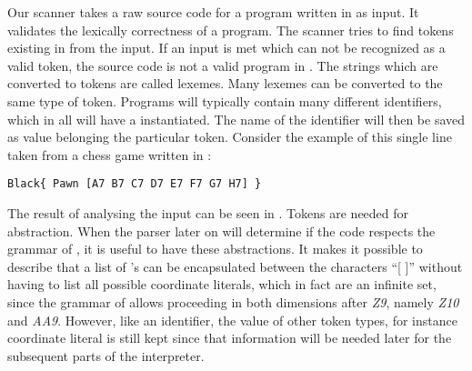 Our scanner takes a raw source code for a program written in \productname{} as input. It validates the lexically correctness of a \productname{} program. The scanner tries to find tokens existing in \productname{} from the input. If an input is met which can not be recognized as a valid token, the source code is not a valid program in \productname{}.
 The strings which are converted to tokens are called lexemes. Many lexemes can be converted to the same type of token. Programs will typically contain many different identifiers, which in \productname{} all will have a  instantiated. The name of the identifier will then be saved as value belonging the particular token. Consider the example of this single line taken from a chess game written in \productname{}:
\begin{lstlisting}
Black{ Pawn [A7 B7 C7 D7 E7 F7 G7 H7] }
\end{lstlisting}
The result of analysing the input can be seen in . Tokens are needed for abstraction. When the parser later on will determine if the code respects the grammar of \productname{}, it is useful to have these abstractions. It makes it possible to describe that a list of 's can be encapsulated between the characters ``[ ]'' without having to list all possible coordinate literals, which in fact are an infinite set, since the grammar of \productname{} allows proceeding in both dimensions after \textit{Z9}, namely \textit{Z10} and \textit{AA9}. However, like an identifier, the value of other token types, for instance coordinate literal is still kept since that information will be needed later for the subsequent parts of the interpreter.

